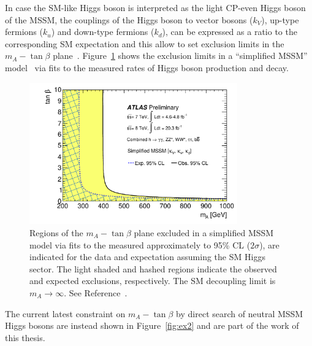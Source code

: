 In case the SM-like Higgs boson is interpreted as the light CP-even Higgs boson of the MSSM, the couplings of the Higgs boson 
to vector bosons ($k_V$), up-type fermions ($k_u$) and down-type fermions ($k_d$), can be expressed as a ratio to the corresponding SM expectation
and this allow to set exclusion limits in the $m_A - \tan\beta$ plane~\cite{AtlasConstraint}. Figure~\ref{fig:ex1} shows the exclusion limits in a 
``simplified MSSM'' model~\cite{atlasCostraint11} via fits to the measured rates of Higgs boson production and decay.

 
\begin{figure}[tp]
     \begin{center}

            \includegraphics[width=0.8\textwidth]{figure/limits/constraintAtlas.pdf}

    \end{center}
    \caption{Regions of the  $m_A - \tan\beta$ plane excluded in a simplified MSSM model via fits to the measured
approximately to 95\% CL ($2\sigma$), are indicated for the data and expectation assuming the SM Higgs sector.
The light shaded and hashed regions indicate the observed and expected exclusions, respectively. The
SM decoupling limit is $m_A \rightarrow \infty$. See Reference~\cite{AtlasConstraint}.}

   \label{fig:ex1}
\end{figure}


The current latest constraint on $m_A - \tan\beta$  by direct search of neutral MSSM Higgs bosons are instead shown in Figure~\ref{fig:ex2}
and are part of the work of this thesis.



